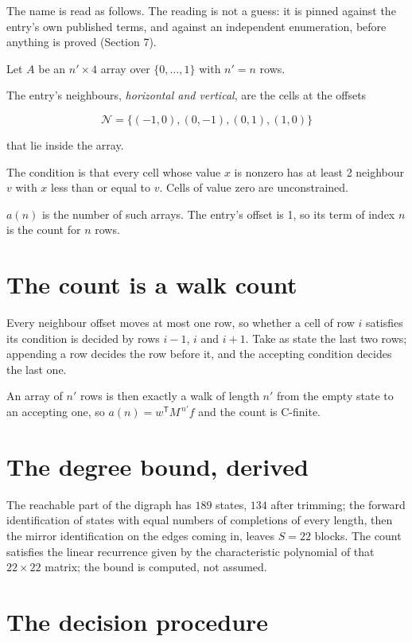 \documentclass[11pt]{article}
\theoremstyle{definition}
\begin{document}
The name is read as follows. The reading is not a guess: it is pinned against the entry's own published terms, and against an independent enumeration, before anything is proved (Section 7).

Let $A$ be an $n' \times 4$ array over $\{0,\dots,1\}$ with $n' = n$ rows.

The entry's neighbours, {\itshape horizontal and vertical}, are the cells at the offsets

\[\mathcal{N} = \{(-1,0), (0,-1), (0,1), (1,0)\}\]

that lie inside the array.

The condition is that every cell whose value $x$ is nonzero has at least 2 neighbour $v$ with $x$ less than or equal to $v$. Cells of value zero are unconstrained.

$a(n)$ is the number of such arrays. The entry's offset is 1, so its term of index $n$ is the count for $n$ rows.

\section{The count is a walk count}

Every neighbour offset moves at most one row, so whether a cell of row $i$ satisfies its condition is decided by rows $i-1$, $i$ and $i+1$. Take as state the last two rows; appending a row decides the row before it, and the accepting condition decides the last one.

An array of $n'$ rows is then exactly a walk of length $n'$ from the empty state to an accepting one, so $a(n) = w^{\mathsf T}M^{\,n'}f$ and the count is C-finite.

\section{The degree bound, derived}

The reachable part of the digraph has $189$ states, $134$ after trimming; the forward identification of states with equal numbers of completions of every length, then the mirror identification on the edges coming in, leaves $S = 22$ blocks. The count satisfies the linear recurrence given by the characteristic polynomial of that $22\times22$ matrix; the bound is computed, not assumed.

\section{The decision procedure}
\end{document}
